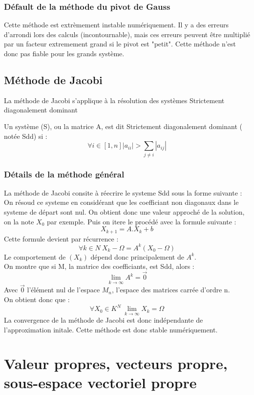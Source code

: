 \subsubsection{Défault de la méthode du pivot de Gauss}
Cette méthode est extrèmement instable numériquement. Il y a des erreurs d'arrondi lors des calculs (incontournable), mais ces erreurs peuvent être multiplié par un facteur extremement grand si le pivot est "petit". Cette méthode n'est donc pas fiable pour les grands système.
\subsection{Méthode de Jacobi}
La méthode de Jacobi s'applique à la résolution des systèmes Strictement diagonalement dominant
\begin{de}
Un système (S), ou la matrice A, est dit Strictement diagonalement dominant ( notée Sdd) si : 
$$\forall i \in [1,n] |a_{ii}| > \underset{j \neq i}\sum |a_{ij}|$$
\end{de}
\subsubsection{Détails de la méthode général}
La méthode de Jacobi consite à réecrire le systeme Sdd sous la forme suivante : 
On résoud ce systeme en considérant que les coefficiant non diagonaux dans le systeme de départ sont nul. On obtient donc une valeur approché de la solution, on la note $X_0$ par exemple. Puis on itere le procédé avec la formule suivante : 
$$X_{k+1} = A.X_k + b$$
Cette formule devient par récurrence : 
$$\forall k \in N~ X_k -\Omega = A^k ( X_0 - \Omega)$$
Le comportement de $(X_k)$ dépend donc principalement de $A^k$.\\
On montre que si M, la matrice des coefficiants, est Sdd, alors : 
$$\lim_{k\rightarrow \infty} A^k = \overrightarrow{0}$$
Avec $\overrightarrow{0}$ l'élément nul de l'espace $M_n$, l'espace des matrices carrée d'ordre n.\\
On obtient donc que :
$$\forall X_0 \in K^N ~ \lim_{k\rightarrow \infty}X_k = \Omega$$
La convergence de la méthode de Jacobi est donc indépendante de l'approximation initale. Cette méthode est donc stable numériquement.
\section{Valeur propres, vecteurs propre, sous-espace vectoriel propre}
